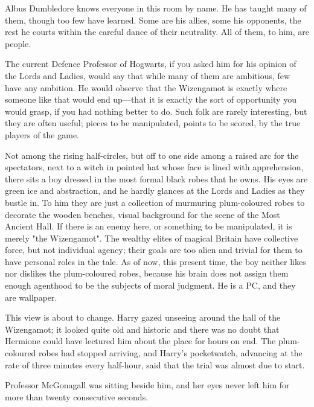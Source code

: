 Albus Dumbledore knows everyone in this room by name. He has taught many of
them, though too few have learned. Some are his allies, some his opponents, the
rest he courts within the careful dance of their neutrality. All of them, to
him, are people.

The current Defence Professor of Hogwarts, if you asked him for his opinion of
the Lords and Ladies, would say that while many of them are ambitious, few have
any ambition. He would observe that the Wizengamot is exactly where someone
like that would end up---that it is exactly the sort of opportunity you would
grasp, if you had nothing better to do. Such folk are rarely interesting, but
they are often useful; pieces to be manipulated, points to be scored, by the
true players of the game.

Not among the rising half-circles, but off to one side among a raised arc for
the spectators, next to a witch in pointed hat whose face is lined with
apprehension, there sits a boy dressed in the most formal black robes that he
owns. His eyes are green ice and abstraction, and he hardly glances at the
Lords and Ladies as they bustle in. To him they are just a collection of
murmuring plum-coloured robes to decorate the wooden benches, visual background
for the scene of the Most Ancient Hall. If there is an enemy here, or something
to be manipulated, it is merely "the Wizengamot". The wealthy elites of magical
Britain have collective force, but not individual agency; their goals are too
alien and trivial for them to have personal roles in the tale. As of now, this
present time, the boy neither likes nor dislikes the plum-coloured robes,
because his brain does not assign them enough agenthood to be the subjects of
moral judgment. He is a PC, and they are wallpaper.

This view is about to change.
\later
Harry gazed unseeing around the hall of the Wizengamot; it looked quite old and
historic and there was no doubt that Hermione could have lectured him about the
place for hours on end. The plum-coloured robes had stopped arriving, and
Harry's pocketwatch, advancing at the rate of three minutes every half-hour,
said that the trial was almost due to start.

Professor McGonagall was sitting beside him, and her eyes never left him for
more than twenty consecutive seconds.

